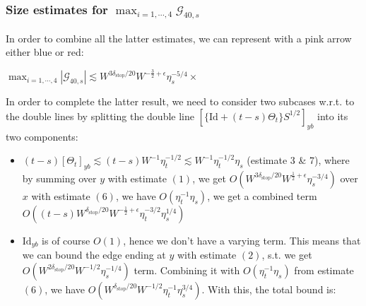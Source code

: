 \documentclass[11pt]{article}
\newcommand{\sto}{\text{stop}}
\begin{document}
\subsubsection*{Size estimates for $\max_{i=1, \cdots, 4}\mathcal{G}_{40, s}$}

In order to combine all the latter estimates, we can represent with a pink arrow either blue or red:\begin{center}

$\max_{i=1, \cdots, 4}\left\vert\mathcal{G}_{40, s}\right\vert\lesssim  W^{3\delta_\sto/20} W^{-\frac{3}{2}+\epsilon}\eta_s^{-5/4}\times $
\end{center}
In order to complete the latter result, we need to consider two subcases w.r.t. to the double lines by splitting the double line $\left[\{\text{Id} + (t-s)\Theta_t\}S^{1/2}\right]_{yb}$ into its two components:
\begin{itemize}
\item $(t-s)\left[\Theta_t\right]_{yb} \lesssim (t-s)W^{-1}\eta_t^{-1/2}\lesssim W^{-1}\eta_t^{-1/2}\eta_s$ (estimate 3 \& 7), where by summing over $y$ with estimate $(1)$, we get $ O(W^{3\delta_\sto/20}W^{\frac{1}{2}+\epsilon}\eta_s^{-3/4})$  over $x$ with estimate $(6)$, we have $O(\eta_t^{-1}\eta_s)$, we get a combined term $O((t-s) W^{\delta_\sto/20}W^{-\frac{1}{2}+\epsilon}\eta_t^{-3/2}\eta_s^{1/4})$
\item $\text{Id}_{yb}$ is of course $O(1)$, hence we don't have a varying term. This means that we can bound the edge ending at $y$ with estimate $(2)$, s.t. we get $O( W^{2\delta_\sto/20}W^{-1/2}\eta_s^{-1/4})$ term. Combining it with $O(\eta_t^{-1}\eta_s)$ from estimate $(6)$, we have $O( W^{\delta_\sto/20}W^{-1/2}\eta_t^{-1}\eta_s^{3/4})$. With this, the total bound is: 
\end{itemize}
\end{document}
